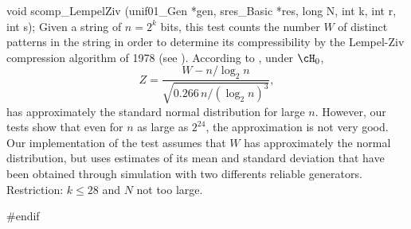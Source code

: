 void scomp_LempelZiv (unif01_Gen *gen, sres_Basic *res,
                      long N, int k, int r, int s);
\endcode
\tab
   Given a string of $n= 2^k$ bits, this test \cite{rRUK01a,rERD92a} 
   counts the number $W$ of distinct patterns in the string in order to
   determine%
   its compressibility by the Lempel-Ziv compression
   algorithm of 1978 (see \cite{iZIV78a}). 
   According to \cite{iKIR94a}, under $\cH_0$, 
   $$
     Z = \frac{W - {n}/{\log_2 n}}{\sqrt{{0.266\,n} /
        {(\log_2 n)^3}}},
   $$
   has approximately the standard normal distribution for large $n$. 
   However, our tests show that even for $n$ as large as $2^{24}$,
   the approximation is not very good.
   Our implementation of the test assumes that $W$ has approximately
   the normal distribution, but uses estimates of its mean and 
   standard deviation that have been obtained through simulation 
   with two differents reliable generators.
   Restriction: $k \le 28$ and $N$ not too large.
\endtab

\code
\hide
#endif
\endhide
\endcode
